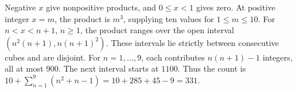 Negative $x$ give nonpositive products, and $0\le x<1$ gives zero. At positive integer $x=m$, the product is $m^3$, supplying ten values for $1\le m\le10$. For $n<x<n+1$, $n\ge1$, the product ranges over the open interval $(n^2(n+1),n(n+1)^2)$. These intervals lie strictly between consecutive cubes and are disjoint. For $n=1,\ldots,9$, each contributes $n(n+1)-1$ integers, all at most $900$. The next interval starts at $1100$. Thus the count is $10+\sum_{n=1}^9(n^2+n-1)=10+285+45-9=\boxed{331}$.
